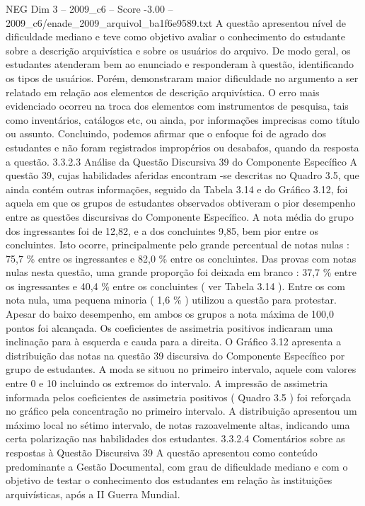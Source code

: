 \begin{textsample}{NEG Dim 3 – 2009\_c6 – Score -3.00 – 2009\_c6/enade\_2009\_arquivol\_ba1f6e9589.txt}
A questão apresentou nível de dificuldade mediano e teve como objetivo avaliar o conhecimento do estudante sobre a descrição arquivística e sobre os usuários do arquivo.
De modo geral, os estudantes atenderam bem ao enunciado e responderam à questão, identificando os tipos de usuários.
Porém, demonstraram maior dificuldade no argumento a ser relatado em relação aos elementos de descrição arquivística.
O erro mais evidenciado ocorreu na troca dos elementos com instrumentos de pesquisa, tais como inventários, catálogos etc, ou ainda, por informações imprecisas como título ou assunto.
Concluindo, podemos afirmar que o enfoque foi de agrado dos estudantes e não foram registrados impropérios ou desabafos, quando da resposta a questão. 3.3.2.3 Análise da Questão Discursiva 39 do Componente Específico A questão 39, cujas habilidades aferidas encontram -se descritas no Quadro 3.5, que ainda contém outras informações, seguido da Tabela 3.14 e do Gráfico 3.12, foi aquela em que os grupos de estudantes observados obtiveram o pior desempenho entre as questões discursivas do Componente Específico.
A nota média do grupo dos ingressantes foi de 12,82, e a dos concluintes 9,85, bem pior entre os concluintes.
Isto ocorre, principalmente pelo grande percentual de notas nulas : 75,7 \% entre os ingressantes e 82,0 \% entre os concluintes.
Das provas com notas nulas nesta questão, uma grande proporção foi deixada em branco : 37,7 \% entre os ingressantes e 40,4 \% entre os concluintes ( ver Tabela 3.14 ).
Entre os com nota nula, uma pequena minoria ( 1,6 \% ) utilizou a questão para protestar.
Apesar do baixo desempenho, em ambos os grupos a nota máxima de 100,0 pontos foi alcançada.
Os coeficientes de assimetria positivos indicaram uma inclinação para à esquerda e cauda para a direita.
O Gráfico 3.12 apresenta a distribuição das notas na questão 39 discursiva do Componente Específico por grupo de estudantes.
A moda se situou no primeiro intervalo, aquele com valores entre 0 e 10 incluindo os extremos do intervalo.
A impressão de assimetria informada pelos coeficientes de assimetria positivos ( Quadro 3.5 ) foi reforçada no gráfico pela concentração no primeiro intervalo.
A distribuição apresentou um máximo local no sétimo intervalo, de notas razoavelmente altas, indicando uma certa polarização nas habilidades dos estudantes. 3.3.2.4 Comentários sobre as respostas à Questão Discursiva 39 A questão apresentou como conteúdo predominante a Gestão Documental, com grau de dificuldade mediano e com o objetivo de testar o conhecimento dos estudantes em relação às instituições arquivísticas, após a II Guerra Mundial.

\end{textsample}
